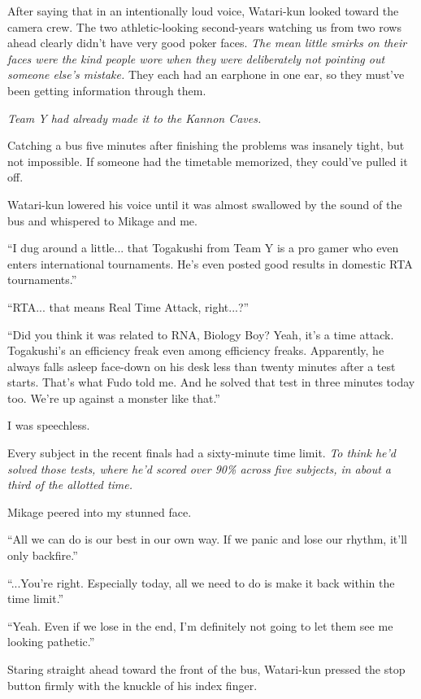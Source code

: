 \documentclass[
    a4paper,
    12pt,
    twoside,
    openany,
    UTF8,
    fontset=windows
]{ctexbook}
\begin{document}
After saying that in an intentionally loud voice, Watari-kun looked toward the camera crew. The two athletic-looking second-years watching us from two rows ahead clearly didn't have very good poker faces. \textit{The mean little smirks on their faces were the kind people wore when they were deliberately not pointing out someone else's mistake.} They each had an earphone in one ear, so they must've been getting information through them.

\textit{Team Y had already made it to the Kannon Caves.}

Catching a bus five minutes after finishing the problems was insanely tight, but not impossible. If someone had the timetable memorized, they could've pulled it off.

Watari-kun lowered his voice until it was almost swallowed by the sound of the bus and whispered to Mikage and me.

``I dug around a little... that Togakushi from Team Y is a pro gamer who even enters international tournaments. He's even posted good results in domestic RTA tournaments.''

``RTA... that means Real Time Attack, right...?''

``Did you think it was related to RNA, Biology Boy? Yeah, it's a time attack. Togakushi's an efficiency freak even among efficiency freaks. Apparently, he always falls asleep face-down on his desk less than twenty minutes after a test starts. That's what Fudo told me. And he solved that test in three minutes today too. We're up against a monster like that.''

I was speechless.

Every subject in the recent finals had a sixty-minute time limit. \textit{To think he'd solved those tests, where he'd scored over 90\% across five subjects, in about a third of the allotted time.}

Mikage peered into my stunned face.

``All we can do is our best in our own way. If we panic and lose our rhythm, it'll only backfire.''

``...You're right. Especially today, all we need to do is make it back within the time limit.''

``Yeah. Even if we lose in the end, I'm definitely not going to let them see me looking pathetic.''

Staring straight ahead toward the front of the bus, Watari-kun pressed the stop button firmly with the knuckle of his index finger.
\end{document}
